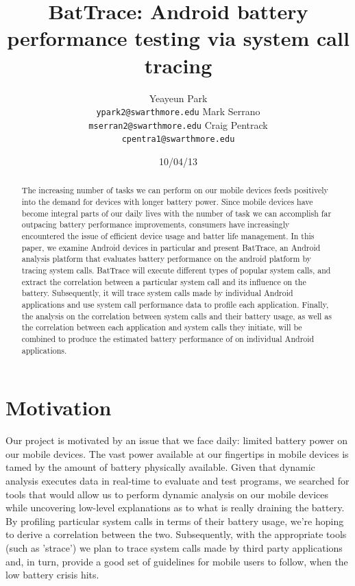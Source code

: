 \documentclass[11pt]{article}
\title{BatTrace: Android battery performance testing via system call tracing}
\author{Yeayeun Park\\
{\tt ypark2@swarthmore.edu}
\And 
Mark Serrano\\
{\tt mserran2@swarthmore.edu}
\AND
Craig Pentrack\\                 
{\tt cpentra1@swarthmore.edu}}
\date{10/04/13}
\begin{document}
\maketitle
\begin{abstract}
  The increasing number of tasks we can perform on our mobile devices 
  feeds positively into the demand for devices with longer battery power. 
  Since mobile devices have become integral parts of our daily lives with
  the number of task we can accomplish far outpacing battery performance 
  improvements, consumers have increasingly encountered the issue of 
  efficient device usage and batter life management. In this paper, we 
  examine Android devices in particular and present BatTrace, an Android 
  analysis platform that evaluates battery performance on the android platform
  by tracing system calls. BatTrace will execute different types of popular system
  calls, and extract the correlation between a particular system call and its 
  influence on the battery. Subsequently, it will trace system calls made by 
  individual Android applications and use system call performance data to profile
  each application. Finally, the analysis on the correlation between system calls and their 
  battery usage, as well as the correlation between each application and system 
  calls they initiate, will be combined to produce the estimated battery performance 
  of on individual Android applications.
\end{abstract}

\section{Motivation}

Our project is motivated by an issue that we face daily: limited battery power 
on our mobile devices. The vast power available at our fingertips in mobile
devices is tamed by the amount of battery physically available. Given 
that dynamic analysis executes data in real-time to evaluate and test programs, 
we searched for tools that would allow us to perform dynamic analysis on our 
mobile devices while uncovering low-level explanations as to what is really 
draining the battery. By profiling particular system calls in terms of their battery
usage, we're hoping to derive a correlation between the two. Subsequently, with the
appropriate tools (such as 'strace') we plan to trace system calls made by third 
party applications and, in turn, provide a good set of guidelines for mobile users 
to follow, when the low battery crisis hits.
\end{document}
